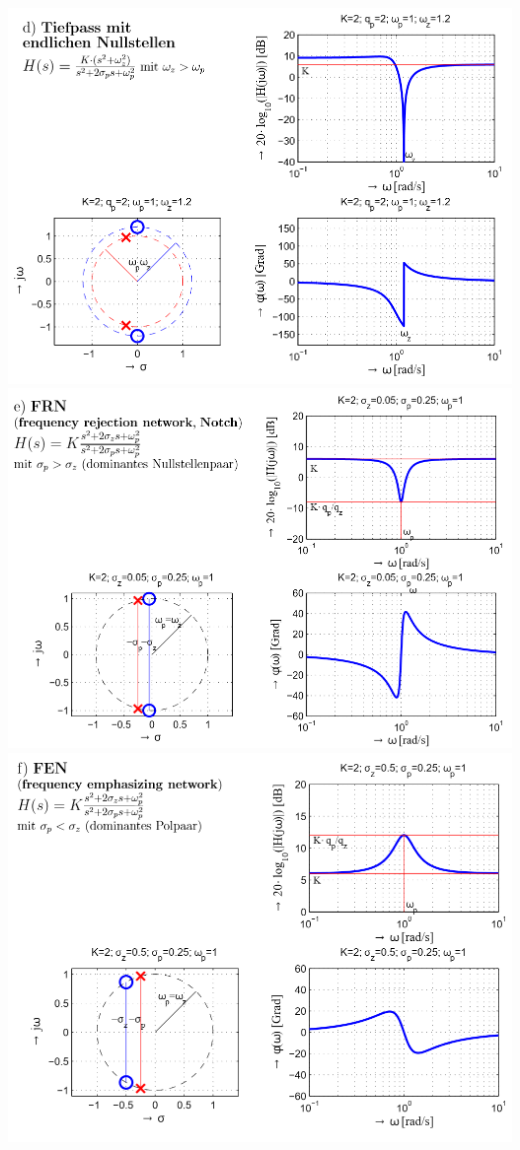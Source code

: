 \begin{center}
	\includegraphics[width=0.8\columnwidth]{Images/tiefpass_en}\\
	\includegraphics[width=0.8\columnwidth]{Images/frn}\\
	\includegraphics[width=0.8\columnwidth]{Images/fen}\\
\end{center}

